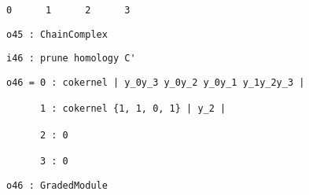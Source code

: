 \documentclass[12pt,leqno]{amsart}
\theoremstyle{definition}
\begin{document}
\begin{lstlisting}[xleftmargin=10pt, aboveskip=1.5pt, belowskip=1.5pt]
      0      1      2      3
\end{lstlisting}
\begin{lstlisting}[xleftmargin=10pt, aboveskip=1.5pt, belowskip=1.5pt] 
o45 : ChainComplex
\end{lstlisting}
\vfill
\begin{lstlisting}[xleftmargin=10pt, aboveskip=1.5pt, belowskip=1.5pt] 
i46 : prune homology C'
\end{lstlisting}
\begin{lstlisting}[xleftmargin=10pt, lineskip=-10pt, aboveskip=1.5pt, belowskip=1.5pt]
o46 = 0 : cokernel | y_0y_3 y_0y_2 y_0y_1 y_1y_2y_3 |

      1 : cokernel {1, 1, 0, 1} | y_2 |              

      2 : 0                                          

      3 : 0   
\end{lstlisting}
\begin{lstlisting}[xleftmargin=10pt, aboveskip=1.5pt, belowskip=3.0pt]
o46 : GradedModule
\end{lstlisting}
\end{document}
